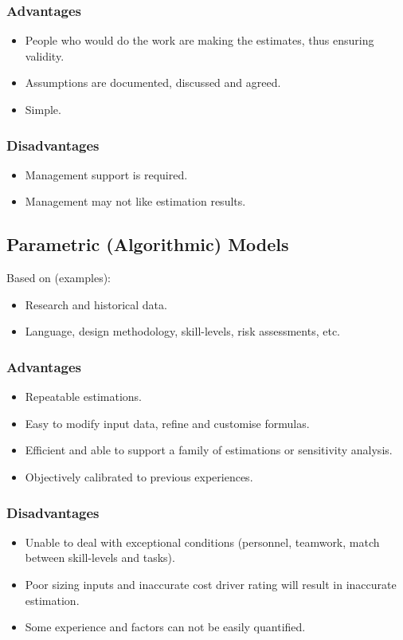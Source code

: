 \documentclass[landscape]{cheat}
\begin{document}
\begin{multicols}{3}
\subsubsection{Advantages}
\begin{itemize}
    \item People who would do the work are making the estimates, thus ensuring validity.
    \item Assumptions are documented, discussed and agreed.
    \item Simple.
\end{itemize}
\subsubsection{Disadvantages}
\begin{itemize}
    \item Management support is required.
    \item Management may not like estimation results.
\end{itemize}

\subsection{Parametric (Algorithmic) Models}
Based on (examples):
\begin{itemize}
    \item Research and historical data.
    \item Language, design methodology, skill-levels, risk assessments, etc.
\end{itemize}
\subsubsection{Advantages}
\begin{itemize}
    \item Repeatable estimations.
    \item Easy to modify input data, refine and customise formulas.
    \item Efficient and able to support a family of estimations or sensitivity analysis.
    \item Objectively calibrated to previous experiences.
\end{itemize}
\subsubsection{Disadvantages}
\begin{itemize}
    \item Unable to deal with exceptional conditions (personnel, teamwork, match between skill-levels and tasks).
    \item Poor sizing inputs and inaccurate cost driver rating will result in inaccurate estimation.
    \item Some experience and factors can not be easily quantified.
\end{itemize}

\end{multicols}
\end{document}
